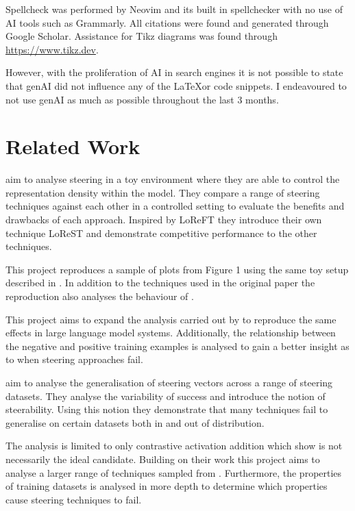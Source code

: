 Spellcheck was performed by Neovim and its built in spellchecker with no use of AI tools such as Grammarly.
All citations were found and generated through Google Scholar.
Assistance for Tikz diagrams was found through \href{https://www.tikz.dev}{https://www.tikz.dev}.

However, with the proliferation of AI in search engines it is not possible to state that genAI did not influence any of the \LaTeX or code snippets.
I endeavoured to not use genAI as much as possible throughout the last 3 months.

\section{Related Work}

aim to analyse steering in a toy environment where they are able to control the representation density within the model.
They compare a range of steering techniques \citep{caa, reft, mimic} against each other in a controlled setting to evaluate the benefits and drawbacks of each approach.
Inspired by LoReFT \citep{reft} they introduce their own technique LoReST and demonstrate competitive performance to the other techniques.

This project reproduces a sample of plots from Figure 1 using the same toy setup described in .
In addition to the techniques used in the original paper the reproduction also analyses the behaviour of \citet{ace}.

This project aims to expand the analysis carried out by \citet{steering-clear} to reproduce the same effects in large language model systems.
Additionally, the relationship between the negative and positive training examples is analysed to gain a better insight as to when steering approaches fail.

aim to analyse the generalisation of steering vectors across a range of steering datasets.
They analyse the variability of success and introduce the notion of steerability.
Using this notion they demonstrate that many techniques fail to generalise on certain datasets both in and out of distribution.

The analysis is limited to only contrastive activation addition \citep{caa} which \citet{steering-clear} show is not necessarily the ideal candidate.
Building on their work this project aims to analyse a larger range of techniques sampled from \citet{steering-clear}.
Furthermore, the properties of training datasets is analysed in more depth to determine which properties cause steering techniques to fail.

